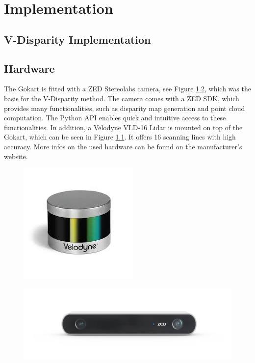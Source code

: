 
\chapter{Implementation}
\label{chp:Implementation}


\section{V-Disparity Implementation}
\label{vdisp_impl}


\section{Hardware}

The Gokart is fitted with a ZED Stereolabs camera, see Figure \ref{fig:zedproductmain}, which was the basis for the V-Disparity method. The camera comes with a ZED SDK, which provides many functionalities, such as disparity map generation and point cloud computation. The Python API enables quick and intuitive access to these functionalities.
In addition, a Velodyne VLD-16 Lidar is mounted on top of the Gokart, which can be seen in Figure \ref{fig:lidar}. It offers 16 scanning lines with high accuracy.
More infos on the used hardware can be found on the manufacturer's website.

\begin{figure}
	\centering
	\includegraphics[width=0.5\linewidth]{Figures/lidar}
	\caption[Velodyne Vld-16 Lidar Sensor]{}
	\label{fig:lidar}
\end{figure}

\begin{figure}
	\centering
	\includegraphics[width=0.7\linewidth]{Figures/ZED_product_main}
	\caption[ZED Stereolabs Camera]{}
	\label{fig:zedproductmain}
\end{figure}



